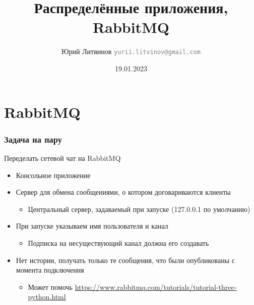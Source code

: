 \documentclass[xetex,mathserif,serif]{beamer}
\title{Распределённые приложения, RabbitMQ}
\author[Юрий Литвинов]{Юрий Литвинов \newline \textcolor{gray}{\small\texttt{yurii.litvinov@gmail.com}}}
\date{19.01.2023}
\begin{document}
	\frame{\titlepage}

	\section{RabbitMQ}

	\begin{frame}
		\frametitle{Задача на пару}
		Переделать сетевой чат на RabbitMQ
		\begin{itemize}
			\item Консольное приложение
			\item Сервер для обмена сообщениями, о котором договариваются клиенты
			\begin{itemize}
				\item Центральный сервер, задаваемый при запуске (127.0.0.1 по умолчанию)
			\end{itemize}
			\item При запуске указываем имя пользователя и канал
			\begin{itemize}
				\item Подписка на несуществующий канал должна его создавать
			\end{itemize}
			\item Нет истории, получать только те сообщения, что были опубликованы с момента подключения
			\begin{itemize}
				\item Может помочь \url{https://www.rabbitmq.com/tutorials/tutorial-three-python.html}
			\end{itemize}
		\end{itemize}
	\end{frame}
\end{document}
